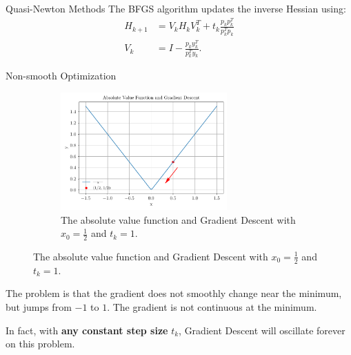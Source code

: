 \documentclass{beamer}
\begin{document}
\begin{frame}{Quasi-Newton Methods}
     {
        The BFGS algorithm updates the inverse Hessian using:
        \begin{align*}
            H_{k + 1} & = V_k H_k V_k^T + t_k \frac{
                p_k p_k^T
            }{p_k^T p_k}                                   \\
            V_k       & = I - \frac{p_k y_k^T}{p_k^T y_k}.
        \end{align*}
    }
\end{frame}

\begin{frame}{Non-smooth Optimization}
     {
        \begin{figure}
            \begin{figure}
                \centering
                \includegraphics[width=0.7\textwidth]{plots/abs_val_func.pdf}
                \caption{The absolute value function and Gradient Descent
                    with $x_0 = \frac{1}{2}$ and $t_k = 1$.}
                \label{fig:abs_value_function}
            \end{figure}
        \end{figure}
    }

     {
        The problem is that the gradient does not smoothly change
        near the minimum, but jumps from $-1$ to $1$.
        The gradient is not continuous at the minimum.
    }

     {
        In fact, with \textbf{any constant step size} $t_k$,
        Gradient Descent will oscillate forever on this problem.
    }
\end{frame}
\end{document}
